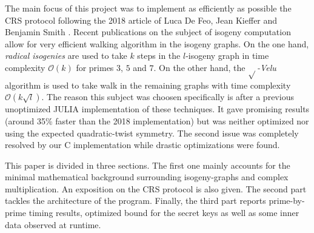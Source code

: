\documentclass[../main.tex]{subfiles}
\begin{document}
The main focus of this project was to implement as efficiently as possible the CRS protocol following the 2018 article of Luca De Feo, Jean Kieffer and Benjamin Smith \cite{mainArticle}.
Recent publications on the subject of isogeny computation allow for very efficient walking algorithm in the isogeny graphs.
On the one hand, \textit{radical isogenies} \cite{radicalPaper} are used to take $k$ steps in the $l$-isogeny graph in time complexity $\mathcal{O}(k)$ for primes $3$, $5$ and $7$.
On the other hand, the $\sqrt{}$\textit{-Velu} algorithm \cite{sqrtVelu} is used to take walk in the remaining graphs with time complexity $\mathcal{O}(k\sqrt{l})$.
The reason this subject was choosen specifically is after a previous unoptimized JULIA implementation of these techniques.
It gave promising results (around 35\% faster than the 2018 implementation) but was neither optimized nor using the expected quadratic-twist symmetry.
The second issue was completely resolved by our C implementation while drastic optimizations were found.

This paper is divided in three sections.
The first one mainly accounts for the minimal mathematical background surrounding isogeny-graphs and complex multiplication.
An exposition on the CRS protocol is also given.
The second part tackles the architecture of the program.
Finally, the third part reports prime-by-prime timing results, optimized bound for the secret keys as well as some inner data observed at runtime.
\end{document}
